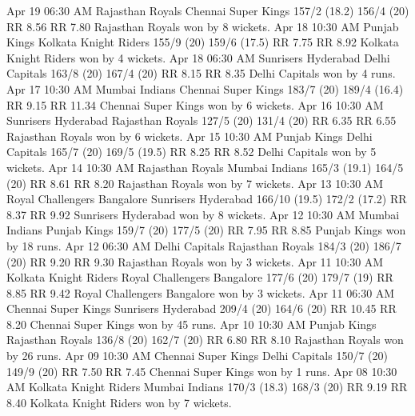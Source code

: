 Apr 19
06:30 AM
Rajasthan Royals
Chennai Super Kings
157/2 (18.2)
156/4 (20)
RR 8.56
RR 7.80
Rajasthan Royals won by 8 wickets.
Apr 18
10:30 AM
Punjab Kings
Kolkata Knight Riders
155/9 (20)
159/6 (17.5)
RR 7.75
RR 8.92
Kolkata Knight Riders won by 4 wickets.
Apr 18
06:30 AM
Sunrisers Hyderabad
Delhi Capitals
163/8 (20)
167/4 (20)
RR 8.15
RR 8.35
Delhi Capitals won by 4 runs.
Apr 17
10:30 AM
Mumbai Indians
Chennai Super Kings
183/7 (20)
189/4 (16.4)
RR 9.15
RR 11.34
Chennai Super Kings won by 6 wickets.
Apr 16
10:30 AM
Sunrisers Hyderabad
Rajasthan Royals
127/5 (20)
131/4 (20)
RR 6.35
RR 6.55
Rajasthan Royals won by 6 wickets.
Apr 15
10:30 AM
Punjab Kings
Delhi Capitals
165/7 (20)
169/5 (19.5)
RR 8.25
RR 8.52
Delhi Capitals won by 5 wickets.
Apr 14
10:30 AM
Rajasthan Royals
Mumbai Indians
165/3 (19.1)
164/5 (20)
RR 8.61
RR 8.20
Rajasthan Royals won by 7 wickets.
Apr 13
10:30 AM
Royal Challengers Bangalore
Sunrisers Hyderabad
166/10 (19.5)
172/2 (17.2)
RR 8.37
RR 9.92
Sunrisers Hyderabad won by 8 wickets.
Apr 12
10:30 AM
Mumbai Indians
Punjab Kings
159/7 (20)
177/5 (20)
RR 7.95
RR 8.85
Punjab Kings won by 18 runs.
Apr 12
06:30 AM
Delhi Capitals
Rajasthan Royals
184/3 (20)
186/7 (20)
RR 9.20
RR 9.30
Rajasthan Royals won by 3 wickets.
Apr 11
10:30 AM
Kolkata Knight Riders
Royal Challengers Bangalore
177/6 (20)
179/7 (19)
RR 8.85
RR 9.42
Royal Challengers Bangalore won by 3 wickets.
Apr 11
06:30 AM
Chennai Super Kings
Sunrisers Hyderabad
209/4 (20)
164/6 (20)
RR 10.45
RR 8.20
Chennai Super Kings won by 45 runs.
Apr 10
10:30 AM
Punjab Kings
Rajasthan Royals
136/8 (20)
162/7 (20)
RR 6.80
RR 8.10
Rajasthan Royals won by 26 runs.
Apr 09
10:30 AM
Chennai Super Kings
Delhi Capitals
150/7 (20)
149/9 (20)
RR 7.50
RR 7.45
Chennai Super Kings won by 1 runs.
Apr 08
10:30 AM
Kolkata Knight Riders
Mumbai Indians
170/3 (18.3)
168/3 (20)
RR 9.19
RR 8.40
Kolkata Knight Riders won by 7 wickets.